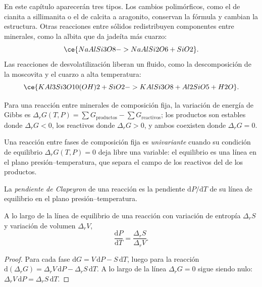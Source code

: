 En este capítulo aparecerán tres tipos. Los cambios polimórficos, como el de cianita a
sillimanita o el de calcita a aragonito, conservan la fórmula y cambian la estructura.
Otras reacciones entre sólidos redistribuyen componentes entre minerales, como la
albita que da jadeíta más cuarzo:
\[
\ce{NaAlSi3O8 -> NaAlSi2O6 + SiO2}.
\]
Las reacciones de desvolatilización liberan un fluido, como la descomposición de la moscovita y el cuarzo
a alta temperatura:
\[
\ce{KAl3Si3O10(OH)2 + SiO2 -> KAlSi3O8 + Al2SiO5 + H2O}.
\]

Para una reacción entre minerales de composición fija, la variación de energía de Gibbs es
$\Delta_r G(T, P) = \sum G_{\text{productos}} - \sum G_{\text{reactivos}}$; los productos
son estables donde $\Delta_r G < 0$, los reactivos donde $\Delta_r G > 0$, y ambos
coexisten donde $\Delta_r G = 0$.

\begin{definition}\label{def:b2:metamorphic-facies:univariant}
Una reacción entre fases de composición fija es \emph{univariante}
cuando su condición de equilibrio $\Delta_r G(T, P) = 0$ deja libre una
variable: el equilibrio es una línea en el plano presión--temperatura, que separa
el campo de los reactivos del de los productos.
\end{definition}

\begin{definition}\label{def:b2:metamorphic-facies:clapeyron}
La \emph{pendiente de Clapeyron} de una reacción es la pendiente
$\mathrm dP/\mathrm dT$ de su línea de equilibrio en el plano presión--temperatura.
\end{definition}

\begin{proposition}\label{prop:b2:metamorphic-facies:clapeyron}
A lo largo de la línea de equilibrio de una reacción con variación de entropía $\Delta_r S$ y variación
de volumen $\Delta_r V$,
\[
\frac{\mathrm dP}{\mathrm dT} = \frac{\Delta_r S}{\Delta_r V}.
\]
\end{proposition}

\begin{proof}
Para cada fase $\mathrm dG = V\,\mathrm dP - S\,\mathrm dT$, luego para la reacción
$\mathrm d(\Delta_r G) = \Delta_r V\,\mathrm dP - \Delta_r S\,\mathrm dT$. A lo largo de la línea
$\Delta_r G = 0$ sigue siendo nulo: $\Delta_r V\,\mathrm dP = \Delta_r S\,\mathrm dT$.
\end{proof}

